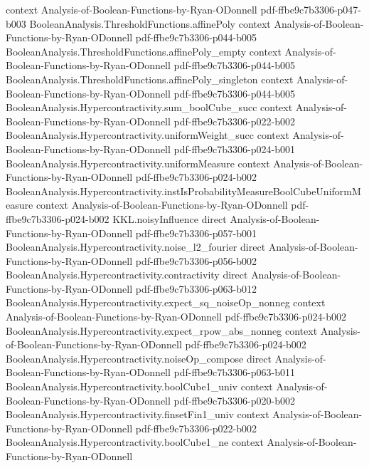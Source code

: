 \begin{theorem}
  {context}
  {Analysis-of-Boolean-Functions-by-Ryan-ODonnell}
  {pdf-ffbe9c7b3306-p047-b003}
\proofstep
  {BooleanAnalysis.ThresholdFunctions.affinePoly}
  {context}
  {Analysis-of-Boolean-Functions-by-Ryan-ODonnell}
  {pdf-ffbe9c7b3306-p044-b005}
\proofstep
  {BooleanAnalysis.ThresholdFunctions.affinePoly_empty}
  {context}
  {Analysis-of-Boolean-Functions-by-Ryan-ODonnell}
  {pdf-ffbe9c7b3306-p044-b005}
\proofstep
  {BooleanAnalysis.ThresholdFunctions.affinePoly_singleton}
  {context}
  {Analysis-of-Boolean-Functions-by-Ryan-ODonnell}
  {pdf-ffbe9c7b3306-p044-b005}
\proofstep
  {BooleanAnalysis.Hypercontractivity.sum_boolCube_succ}
  {context}
  {Analysis-of-Boolean-Functions-by-Ryan-ODonnell}
  {pdf-ffbe9c7b3306-p022-b002}
\proofstep
  {BooleanAnalysis.Hypercontractivity.uniformWeight_succ}
  {context}
  {Analysis-of-Boolean-Functions-by-Ryan-ODonnell}
  {pdf-ffbe9c7b3306-p024-b001}
\proofstep
  {BooleanAnalysis.Hypercontractivity.uniformMeasure}
  {context}
  {Analysis-of-Boolean-Functions-by-Ryan-ODonnell}
  {pdf-ffbe9c7b3306-p024-b002}
\proofstep
  {BooleanAnalysis.Hypercontractivity.instIsProbabilityMeasureBoolCubeUniformMeasure}
  {context}
  {Analysis-of-Boolean-Functions-by-Ryan-ODonnell}
  {pdf-ffbe9c7b3306-p024-b002}
\proofstep
  {KKL.noisyInfluence}
  {direct}
  {Analysis-of-Boolean-Functions-by-Ryan-ODonnell}
  {pdf-ffbe9c7b3306-p057-b001}
\proofstep
  {BooleanAnalysis.Hypercontractivity.noise_l2_fourier}
  {direct}
  {Analysis-of-Boolean-Functions-by-Ryan-ODonnell}
  {pdf-ffbe9c7b3306-p056-b002}
\proofstep
  {BooleanAnalysis.Hypercontractivity.contractivity}
  {direct}
  {Analysis-of-Boolean-Functions-by-Ryan-ODonnell}
  {pdf-ffbe9c7b3306-p063-b012}
\proofstep
  {BooleanAnalysis.Hypercontractivity.expect_sq_noiseOp_nonneg}
  {context}
  {Analysis-of-Boolean-Functions-by-Ryan-ODonnell}
  {pdf-ffbe9c7b3306-p024-b002}
\proofstep
  {BooleanAnalysis.Hypercontractivity.expect_rpow_abs_nonneg}
  {context}
  {Analysis-of-Boolean-Functions-by-Ryan-ODonnell}
  {pdf-ffbe9c7b3306-p024-b002}
\proofstep
  {BooleanAnalysis.Hypercontractivity.noiseOp_compose}
  {direct}
  {Analysis-of-Boolean-Functions-by-Ryan-ODonnell}
  {pdf-ffbe9c7b3306-p063-b011}
\proofstep
  {BooleanAnalysis.Hypercontractivity.boolCube1_univ}
  {context}
  {Analysis-of-Boolean-Functions-by-Ryan-ODonnell}
  {pdf-ffbe9c7b3306-p020-b002}
\proofstep
  {BooleanAnalysis.Hypercontractivity.finsetFin1_univ}
  {context}
  {Analysis-of-Boolean-Functions-by-Ryan-ODonnell}
  {pdf-ffbe9c7b3306-p022-b002}
\proofstep
  {BooleanAnalysis.Hypercontractivity.boolCube1_ne}
  {context}
  {Analysis-of-Boolean-Functions-by-Ryan-ODonnell}

\end{theorem}

